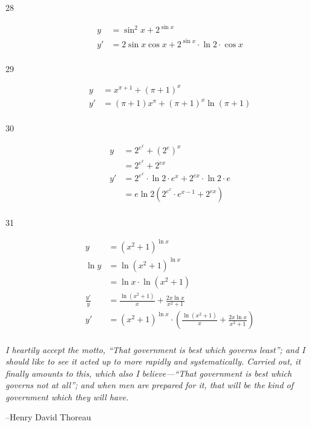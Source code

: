 \documentclass{exam}
\begin{document}
\begin{description}
\item[28]
\begin{align*}
  y &= \sin^2 x + 2^{\sin x} \\
  y' &= 2 \sin x \cos x + 2^{\sin x} \cdot \ln 2 \cdot \cos x \\
\end{align*}

\item[29]
\begin{align*}
  y &= x^{\pi + 1} + (\pi + 1)^x \\
  y' &= (\pi + 1)x^{\pi} + (\pi + 1)^x \ln(\pi + 1) \\
\end{align*}

\item[30]
\begin{align*}
  y &= 2^{e^x} + (2^e)^x \\
    &= 2^{e^x} + 2^{ex} \\
  y' &= 2^{e^x} \cdot \ln 2 \cdot e^x + 2^{ex} \cdot \ln 2 \cdot e \\
     &= e \ln 2 (2^{e^x} \cdot e^{x - 1} + 2^{ex} ) \\
\end{align*}

\item[31]
\begin{align*}
  y &= (x^2 + 1)^{\ln x} \\
  \ln y &= \ln (x^2 + 1)^{\ln x} \\ 
        &= \ln x \cdot \ln (x^2 + 1) \\
  \frac{y'}{y} &= \frac{\ln(x^2 + 1)}{x} + \frac{2x \ln x}{x^2 + 1} \\
  y' &= (x^2 + 1)^{\ln x} \cdot \left( \frac{\ln(x^2 + 1)}{x} + \frac{2x \ln x}{x^2 + 1} \right) \\
\end{align*}

\end{description}
\else


\vspace{9 cm} 

{\em I heartily accept the motto, ``That government is best which governs least''; and I should like to see it acted up
  to more rapidly and systematically. Carried out, it finally amounts to this, which also I believe---``That government
  is best which governs not at all''; and when men are prepared for it, that will be the kind of government which they
  will have.}

\vspace{0.1 cm}
\hspace{0.5 cm} --Henry David Thoreau

\fi
\end{document}
